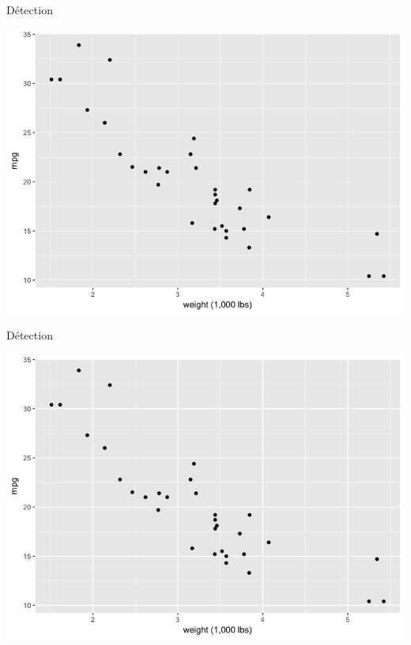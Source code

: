 \documentclass[french]{beamer}
\begin{document}
\begin{frame}{Détection}
\begin{center}
	\includegraphics[height=0.8\textheight]{det3}
\end{center}
\end{frame}

\begin{frame}{Détection}
\begin{center}
	\includegraphics[height=0.8\textheight]{det4}
\end{center}
\end{frame}
\end{document}
